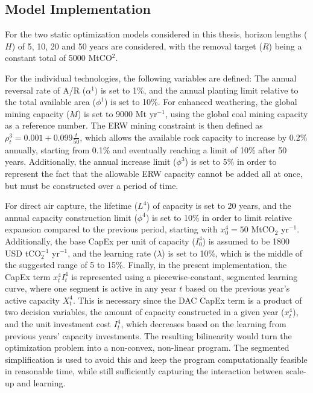 \subsection{Model Implementation}
For the two static optimization models considered in this thesis, horizon lengths ($H$) of 5, 10, 20 and 50 years are considered, with the removal target ($R$) being a constant total of 5000 MtCO$^2$.\vspace{2mm}

For the individual technologies, the following variables are defined: The annual reversal rate of A/R ($\alpha^1)$ is set to 1\%, and the annual planting limit relative to the total available area ($\phi^1$) is set to 10\%. For enhanced weathering, the global mining capacity ($M$) is set to 9000 Mt yr$^{-1}$, using the global coal mining capacity as a reference number. The ERW mining constraint is then defined as  $\rho_t^3= 0.001 + 0.099\frac{t}{50}$, which allows the available rock capacity to increase by 0.2\% annually, starting from 0.1\% and eventually reaching a limit of 10\% after 50 years. Additionally, the annual increase limit ($\phi^3$) is set to 5\% in order to represent the fact that the allowable ERW capacity cannot be added all at once, but must be constructed over a period of time.\vspace{2mm}

For direct air capture, the lifetime ($L^4$) of capacity is set to 20 years, and the annual capacity construction limit ($\phi^4$) is set to 10\% in order to limit relative expansion compared to the previous period, starting with $x_0^4 = 50$ MtCO$_2$ yr$^{-1}$. Additionally, the base CapEx per unit of capacity ($I^4_0$) is assumed to be 1800 USD tCO$_2^{-1}$ yr$^{-1}$, and the learning rate ($\lambda$) is set to 10\%, which is the middle of the suggested range of 5 to 15\%. Finally, in the present implementation, the CapEx term $x_t^4I_t^4$ is represented using a piecewise-constant, segmented learning curve, where one segment is active in any year $t$ based on the previous year's active capacity $X_t^4$. This is necessary since the DAC CapEx term is a product of two decision variables, the amount of capacity constructed in a given year ($x_t^4$), and the unit investment cost $I_t^4$, which decreases based on the learning from previous years' capacity investments. The resulting bilinearity would turn the optimization problem into a non-convex, non-linear program. The segmented simplification is used to avoid this and keep the program computationally feasible in reasonable time, while still sufficiently capturing the interaction between scale-up and learning.

